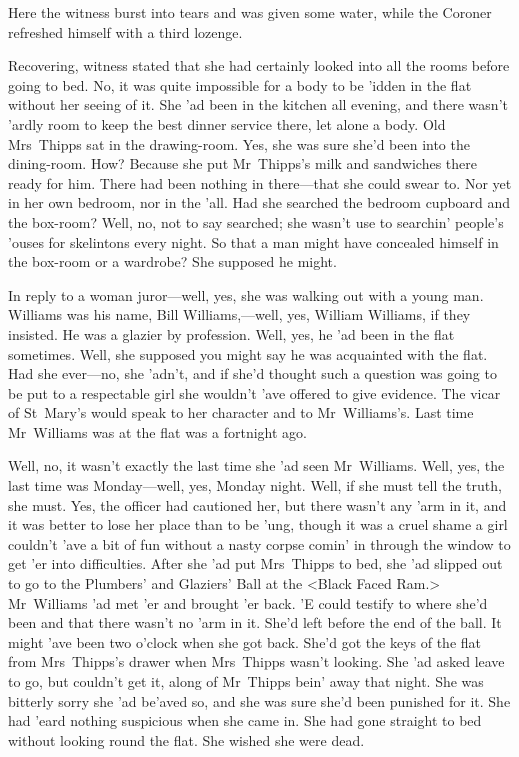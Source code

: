 Here the witness burst into tears and was given some water, while the Coroner refreshed himself with a third lozenge.

Recovering, witness stated that she had certainly looked into all the rooms before going to bed. No, it was quite impossible for a body to be 'idden in the flat without her seeing of it. She 'ad been in the kitchen all evening, and there wasn't 'ardly room to keep the best dinner service there, let alone a body. Old Mrs~Thipps sat in the drawing-room. Yes, she was sure she'd been into the dining-room. How? Because she put Mr~Thipps's milk and sandwiches there ready for him. There had been nothing in there—that she could swear to. Nor yet in her own bedroom, nor in the 'all. Had she searched the bedroom cupboard and the box-room? Well, no, not to say searched; she wasn't use to searchin' people's 'ouses for skelintons every night. So that a man might have concealed himself in the box-room or a wardrobe? She supposed he might.

In reply to a woman juror—well, yes, she was walking out with a young man. Williams was his name, Bill Williams,—well, yes, William Williams, if they insisted. He was a glazier by profession. Well, yes, he 'ad been in the flat sometimes. Well, she supposed you might say he was acquainted with the flat. Had she ever—no, she 'adn't, and if she'd thought such a question was going to be put to a respectable girl she wouldn't 'ave offered to give evidence. The vicar of St~Mary's would speak to her character and to Mr~Williams's. Last time Mr~Williams was at the flat was a fortnight ago.

Well, no, it wasn't exactly the last time she 'ad seen Mr~Williams. Well, yes, the last time was Monday—well, yes, Monday night. Well, if she must tell the truth, she must. Yes, the officer had cautioned her, but there wasn't any 'arm in it, and it was better to lose her place than to be 'ung, though it was a cruel shame a girl couldn't 'ave a bit of fun without a nasty corpse comin' in through the window to get 'er into difficulties. After she 'ad put Mrs~Thipps to bed, she 'ad slipped out to go to the Plumbers' and Glaziers' Ball at the <Black Faced Ram.> Mr~Williams 'ad met 'er and brought 'er back. 'E could testify to where she'd been and that there wasn't no 'arm in it. She'd left before the end of the ball. It might 'ave been two o'clock when she got back. She'd got the keys of the flat from Mrs~Thipps's drawer when Mrs~Thipps wasn't looking. She 'ad asked leave to go, but couldn't get it, along of Mr~Thipps bein' away that night. She was bitterly sorry she 'ad be'aved so, and she was sure she'd been punished for it. She had 'eard nothing suspicious when she came in. She had gone straight to bed without looking round the flat. She wished she were dead.

